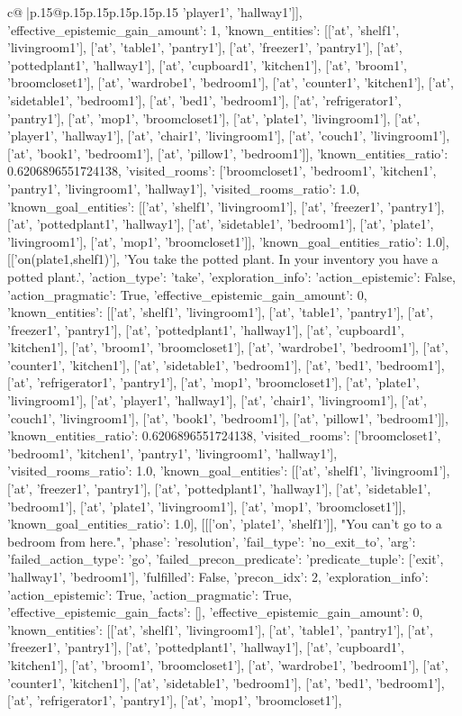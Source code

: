 \documentclass{article}
\begin{document}
{\begin{supertabular}{c@{$\;$}|p{.15\linewidth}@{}p{.15\linewidth}p{.15\linewidth}p{.15\linewidth}p{.15\linewidth}p{.15\linewidth}}
{{{'player1', 'hallway1']], 'effective_epistemic_gain_amount': 1, 'known_entities': [['at', 'shelf1', 'livingroom1'], ['at', 'table1', 'pantry1'], ['at', 'freezer1', 'pantry1'], ['at', 'pottedplant1', 'hallway1'], ['at', 'cupboard1', 'kitchen1'], ['at', 'broom1', 'broomcloset1'], ['at', 'wardrobe1', 'bedroom1'], ['at', 'counter1', 'kitchen1'], ['at', 'sidetable1', 'bedroom1'], ['at', 'bed1', 'bedroom1'], ['at', 'refrigerator1', 'pantry1'], ['at', 'mop1', 'broomcloset1'], ['at', 'plate1', 'livingroom1'], ['at', 'player1', 'hallway1'], ['at', 'chair1', 'livingroom1'], ['at', 'couch1', 'livingroom1'], ['at', 'book1', 'bedroom1'], ['at', 'pillow1', 'bedroom1']], 'known_entities_ratio': 0.6206896551724138, 'visited_rooms': ['broomcloset1', 'bedroom1', 'kitchen1', 'pantry1', 'livingroom1', 'hallway1'], 'visited_rooms_ratio': 1.0, 'known_goal_entities': [['at', 'shelf1', 'livingroom1'], ['at', 'freezer1', 'pantry1'], ['at', 'pottedplant1', 'hallway1'], ['at', 'sidetable1', 'bedroom1'], ['at', 'plate1', 'livingroom1'], ['at', 'mop1', 'broomcloset1']], 'known_goal_entities_ratio': 1.0}}], [['on(plate1,shelf1)'], 'You take the potted plant. In your inventory you have a potted plant.', {'action_type': 'take', 'exploration_info': {'action_epistemic': False, 'action_pragmatic': True, 'effective_epistemic_gain_amount': 0, 'known_entities': [['at', 'shelf1', 'livingroom1'], ['at', 'table1', 'pantry1'], ['at', 'freezer1', 'pantry1'], ['at', 'pottedplant1', 'hallway1'], ['at', 'cupboard1', 'kitchen1'], ['at', 'broom1', 'broomcloset1'], ['at', 'wardrobe1', 'bedroom1'], ['at', 'counter1', 'kitchen1'], ['at', 'sidetable1', 'bedroom1'], ['at', 'bed1', 'bedroom1'], ['at', 'refrigerator1', 'pantry1'], ['at', 'mop1', 'broomcloset1'], ['at', 'plate1', 'livingroom1'], ['at', 'player1', 'hallway1'], ['at', 'chair1', 'livingroom1'], ['at', 'couch1', 'livingroom1'], ['at', 'book1', 'bedroom1'], ['at', 'pillow1', 'bedroom1']], 'known_entities_ratio': 0.6206896551724138, 'visited_rooms': ['broomcloset1', 'bedroom1', 'kitchen1', 'pantry1', 'livingroom1', 'hallway1'], 'visited_rooms_ratio': 1.0, 'known_goal_entities': [['at', 'shelf1', 'livingroom1'], ['at', 'freezer1', 'pantry1'], ['at', 'pottedplant1', 'hallway1'], ['at', 'sidetable1', 'bedroom1'], ['at', 'plate1', 'livingroom1'], ['at', 'mop1', 'broomcloset1']], 'known_goal_entities_ratio': 1.0}}], [[['on', 'plate1', 'shelf1']], "You can't go to a bedroom from here.", {'phase': 'resolution', 'fail_type': 'no_exit_to', 'arg': {'failed_action_type': 'go', 'failed_precon_predicate': {'predicate_tuple': ['exit', 'hallway1', 'bedroom1'], 'fulfilled': False, 'precon_idx': 2}}, 'exploration_info': {'action_epistemic': True, 'action_pragmatic': True, 'effective_epistemic_gain_facts': [], 'effective_epistemic_gain_amount': 0, 'known_entities': [['at', 'shelf1', 'livingroom1'], ['at', 'table1', 'pantry1'], ['at', 'freezer1', 'pantry1'], ['at', 'pottedplant1', 'hallway1'], ['at', 'cupboard1', 'kitchen1'], ['at', 'broom1', 'broomcloset1'], ['at', 'wardrobe1', 'bedroom1'], ['at', 'counter1', 'kitchen1'], ['at', 'sidetable1', 'bedroom1'], ['at', 'bed1', 'bedroom1'], ['at', 'refrigerator1', 'pantry1'], ['at', 'mop1', 'broomcloset1'], }}}
\end{supertabular}}
\end{document}
